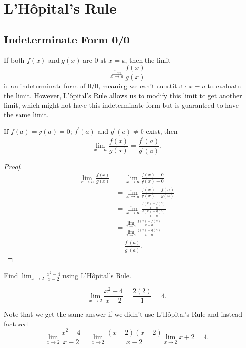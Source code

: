 \section{L'H\^{o}pital's Rule}
\subsection{Indeterminate Form 0/0}
If both $f(x)$ and $g(x)$ are 0 at $x=a$, then the limit
\begin{equation*}
	\lim_{x\to a}{\frac{f(x)}{g(x)}}
\end{equation*}
is an indeterminate form of 0/0, meaning we can't substitute $x=a$ to evaluate the limit.
However, L'\^{o}pital's Rule allows us to modify this limit to get another limit, which might not have this indeterminate form but is guaranteed to have the same limit.

\begin{theorem}
	If $f(a) = g(a) = 0$; $f^\prime(a)$ and $g^\prime(a) \neq 0$ exist, then
	\begin{equation*}
		\lim_{x\to a}{\frac{f(x)}{g(x)}} = \frac{f^\prime(a)}{g^\prime(a)}.
	\end{equation*}
\end{theorem}
\begin{proof}
	\begin{align*}
		\lim_{x\to a}{\frac{f(x)}{g(x)}} &= \lim_{x\to a}{\frac{f(x)-0}{g(x)-0}} \\
		&= \lim_{x\to a}{\frac{f(x)-f(a)}{g(x)-g(a)}} \\
		&= \lim_{x\to a}{\frac{\frac{f(x)-f(a)}{x-a}}{\frac{g(x)-g(a)}{x-a}}} \\
		&= \frac{\lim_{x\to a}{\frac{f(x)-f(a)}{x-a}}}{\lim_{x\to a}{\frac{g(x)-g(a)}{x-a}}} \\
		&= \frac{f^\prime(a)}{g^\prime(a)}.
	\end{align*}
\end{proof}

\begin{example}
	Find $\lim_{x\to 2}{\frac{x^2-4}{x-2}}$ using L'H\^{o}pital's Rule.
\end{example}
\begin{answer}
	\begin{equation*}
		\lim_{x\to 2}{\frac{x^2-4}{x-2}} = \frac{2(2)}{1} = 4.
	\end{equation*}
	
	Note that we get the same answer if we didn't use L'H\^{o}pital's Rule and instead factored.
	\begin{equation*}
		\lim_{x\to 2}{\frac{x^2-4}{x-2}} = \lim_{x\to 2}{\frac{(x+2)(x-2)}{x-2}} \lim_{x\to 2}{x+2} = 4.
	\end{equation*}
\end{answer}


